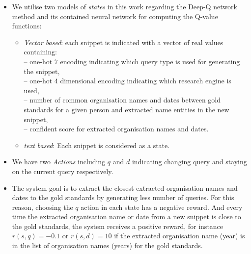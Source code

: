 \begin{itemize}
	\item %
	 We utilise two models of \textit{states} in this work regarding the Deep-Q network method and its contained neural network for computing the Q-value functions:
	\begin{itemize}
		\item \textit{Vector based}: each snippet is indicated with a vector of real values containing: \\
		-- one-hot $7$ encoding indicating which query type is used for generating the snippet,\\
	    -- one-hot $4$ dimensional encoding indicating which research engine is used, \\
		-- number of common organisation names and dates between gold standards for a given person and extracted name entities in the new snippet,\\
        -- confident score for extracted organisation names and dates. 
		\item \textit{text based}: Each snippet is considered as a state.
	\end{itemize}
	\item We have two \textit{Actions} including $q$ and $d$ indicating changing query and staying on the current query respectively. 
	\item The system goal is to extract the closest extracted organisation names and dates to the gold standards by generating less number of queries. For this reason, choosing the $q$ action in each state has a negative reward. And every time the extracted organisation name or date from a new snippet is close to the gold standards, the system receives a positive reward, for instance $r(s, q) = -0.1$ or $r(s, d) = 10$ if the extracted organisation name (year) is in the list of organisation names (years) for the gold standards. 
\end{itemize}

